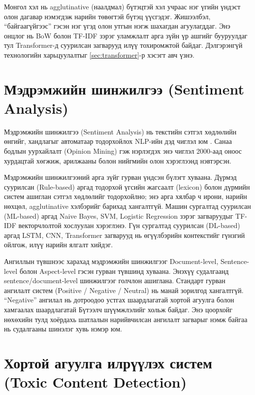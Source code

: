 Монгол хэл нь agglutinative (наалдмал) бүтэцтэй хэл учраас нэг үгийн үндэст
олон дагавар нэмэгдэж нарийн төвөгтэй бүтэц үүсгэдэг. Жишээлбэл,
``байгаагүйгээс'' гэсэн нэг үгэд олон утгын нэгж шахагдан агуулагддаг. Энэ
онцлог нь BoW болон TF-IDF зэрэг уламжлалт арга зүйн үр ашгийг бууруулдаг тул
Transformer-д суурилсан загварууд илүү тохиромжтой байдаг. Дэлгэрэнгүй
технологийн харьцуулалтыг \ref{sec:transformer}-р хэсэгт авч үзнэ.

\section{Мэдрэмжийн шинжилгээ (Sentiment Analysis)}

Мэдрэмжийн шинжилгээ (Sentiment Analysis) нь текстийн сэтгэл хөдлөлийн өнгийг,
хандлагыг автоматаар тодорхойлох NLP-ийн дэд чиглэл юм \cite{liu2012}. Санаа
бодлын уурхайлалт (Opinion Mining) гэж нэрлэгдэх энэ чиглэл 2000-аад оноос
хурдацтай хөгжиж, арилжааны болон нийгмийн олон хэрэглээнд нэвтэрсэн.

Мэдрэмжийн шинжилгээний арга зүйг гурван үндсэн бүлэгт хуваана. Дүрмэд
суурилсан (Rule-based) аргад тодорхой үгсийн жагсаалт (lexicon) болон дүрмийн
систем ашиглан сэтгэл хөдлөлийг тодорхойлно; энэ арга хялбар ч ирони, нарийн
нөхцөл, agglutinative хэлбэрийг барихад хангалтгүй. Машин сургалтад суурилсан
(ML-based) аргад Naive Bayes, SVM, Logistic Regression зэрэг загваруудыг
TF-IDF векторчлолтой хослуулан хэрэглэнэ. Гүн сургалтад суурилсан (DL-based)
аргад LSTM, CNN, Transformer загварууд нь өгүүлбэрийн контекстийг гүнзгий
ойлгож, илүү нарийн ялгалт хийдэг.

Ангиллын түвшнээс харахад мэдрэмжийн шинжилгээг Document-level, Sentence-level
болон Aspect-level гэсэн гурван түвшинд хуваана. Энэхүү судалгаанд
sentence/document-level шинжилгээг голчлон ашиглана. Стандарт гурван ангилалт
систем (Positive / Negative / Neutral) нь манай зорилгод хангалтгүй.
``Negative'' ангилал нь дотроодоо устгах шаардлагатай хортой агуулга болон
хамгаалах шаардлагатай Бүтээлч шүүмжлэлийг хольж байдаг. Энэ цоорхойг
нөхөхийн тулд хоёрдахь шатлалын нарийвчилсан ангилалт загварыг нэмж байгаа нь
судалгааны шинэлэг хувь нэмэр юм.

\section{Хортой агуулга илрүүлэх систем (Toxic Content Detection)}

